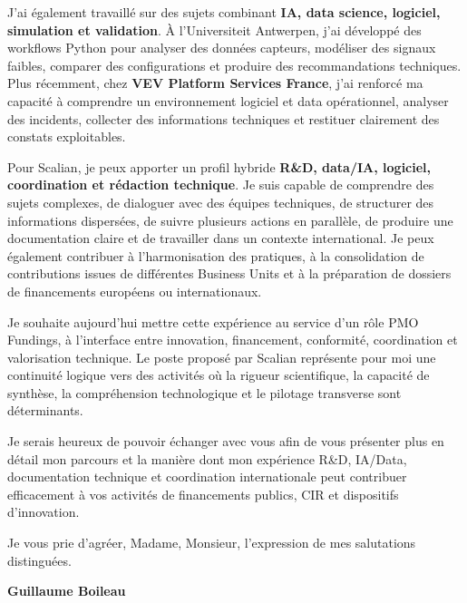 \documentclass[11pt,a4paper]{altacv}
\begin{document}
{J'ai également travaillé sur des sujets combinant \textbf{IA, data science, logiciel, simulation et validation}. À l'Universiteit Antwerpen, j'ai développé des workflows Python pour analyser des données capteurs, modéliser des signaux faibles, comparer des configurations et produire des recommandations techniques. Plus récemment, chez \textbf{VEV Platform Services France}, j'ai renforcé ma capacité à comprendre un environnement logiciel et data opérationnel, analyser des incidents, collecter des informations techniques et restituer clairement des constats exploitables.

Pour Scalian, je peux apporter un profil hybride \textbf{R\&D, data/IA, logiciel, coordination et rédaction technique}. Je suis capable de comprendre des sujets complexes, de dialoguer avec des équipes techniques, de structurer des informations dispersées, de suivre plusieurs actions en parallèle, de produire une documentation claire et de travailler dans un contexte international. Je peux également contribuer à l'harmonisation des pratiques, à la consolidation de contributions issues de différentes Business Units et à la préparation de dossiers de financements européens ou internationaux.

Je souhaite aujourd'hui mettre cette expérience au service d'un rôle PMO Fundings, à l'interface entre innovation, financement, conformité, coordination et valorisation technique. Le poste proposé par Scalian représente pour moi une continuité logique vers des activités où la rigueur scientifique, la capacité de synthèse, la compréhension technologique et le pilotage transverse sont déterminants.

Je serais heureux de pouvoir échanger avec vous afin de vous présenter plus en détail mon parcours et la manière dont mon expérience R\&D, IA/Data, documentation technique et coordination internationale peut contribuer efficacement à vos activités de financements publics, CIR et dispositifs d'innovation.

Je vous prie d'agréer, Madame, Monsieur, l'expression de mes salutations distinguées.

\textbf{Guillaume Boileau}

}
\end{document}
